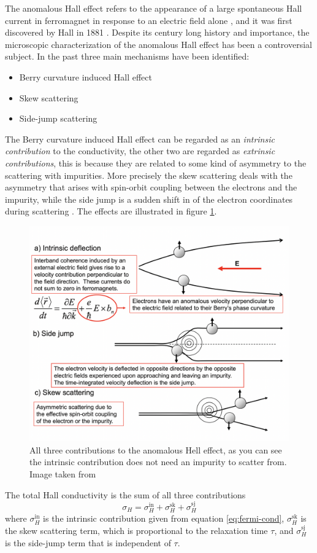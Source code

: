 The anomalous Hall effect refers to the appearance of a large spontaneous Hall current in ferromagnet in response to an electric field alone \cite{vanderbilt2018berry}, and it was first discovered by Hall in 1881 \cite{hall1881}. Despite its century long history and importance, the microscopic characterization of the anomalous Hall effect has been a controversial subject. In the past three main mechanisms have been identified:
\begin{itemize}
    \item Berry curvature induced Hall effect \cite{karplus1954hall}
    \item Skew scattering \cite{smith1958resonant}
    \item Side-jump scattering \cite{berger1970side}
\end{itemize}

The Berry curvature induced Hall effect can be regarded as an \textit{intrinsic contribution} to the conductivity, the other two are regarded as \textit{extrinsic contributions}, this is because they are related to some kind of asymmetry to the scattering with impurities. More precisely the skew scattering deals with the asymmetry that arises with spin-orbit coupling between the electrons and the impurity, while the side jump is a sudden shift in of the electron coordinates during scattering \cite{berger1970side}. The effects are illustrated in figure \ref{fig:anomalous-contributions}.
\begin{figure}
    \centering
    \includegraphics[width=.7\linewidth]{Immagini/ValleyHall/anomalous.png}
    \caption{All three contributions to the anomalous Hell effect, as you can see the intrinsic contribution does not need an impurity to scatter from. Image taken from \cite{nagaosa2010anomalous}}
    \label{fig:anomalous-contributions}
\end{figure}
The total Hall conductivity is the sum of all three contributions
\begin{equation}
    \sigma_H=\sigma_H^\textrm{in}+\sigma_H^\textrm{sk}+\sigma_H^\textrm{sj}
\end{equation}
where $\sigma_H^\textrm{in}$ is the intrinsic contribution given from equation \ref{eq:fermi-cond}, $\sigma_H^\textrm{sk}$ is the skew scattering term, which is proportional to the relaxation time $\tau$, and $\sigma_H^\textrm{sj}$ is the side-jump term that is independent of $\tau$.

